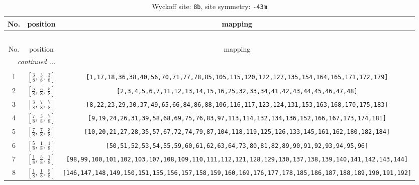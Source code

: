 \documentclass[fleqn,8pt]{jsarticle}
\begin{document}
\renewcommand{\arraystretch}{1.2}
\begin{longtable}{ccc}
\caption{Wyckoff site: {\tt 8b}, site symmetry: {\tt -43m}}
 \\
 \hline \hline
No. & position & mapping \\ \hline \endfirsthead

\multicolumn{2}{l}{\tablename\ \thetable{}} \\
 \hline \hline
No. & position & mapping \\ \hline \endhead

 \hline \hline
\multicolumn{2}{r}{\footnotesize\it continued ...} \\ \endfoot

 \hline \hline
\multicolumn{2}{r}{} \\ \endlastfoot

1 & $\left[ \frac{3}{8},\, \frac{3}{8},\, \frac{3}{8} \right]$ & {\tt [1,17,18,36,38,40,56,70,71,77,78,85,105,115,120,122,127,135,154,164,165,171,172,179]} \\ \hline
2 & $\left[ \frac{5}{8},\, \frac{5}{8},\, \frac{5}{8} \right]$ & {\tt [2,3,4,5,6,7,11,12,13,14,15,16,25,32,33,34,41,42,43,44,45,46,47,48]} \\ \hline
3 & $\left[ \frac{3}{8},\, \frac{7}{8},\, \frac{7}{8} \right]$ & {\tt [8,22,23,29,30,37,49,65,66,84,86,88,106,116,117,123,124,131,153,163,168,170,175,183]} \\ \hline
4 & $\left[ \frac{7}{8},\, \frac{3}{8},\, \frac{7}{8} \right]$ & {\tt [9,19,24,26,31,39,58,68,69,75,76,83,97,113,114,132,134,136,152,166,167,173,174,181]} \\ \hline
5 & $\left[ \frac{7}{8},\, \frac{7}{8},\, \frac{3}{8} \right]$ & {\tt [10,20,21,27,28,35,57,67,72,74,79,87,104,118,119,125,126,133,145,161,162,180,182,184]} \\ \hline
6 & $\left[ \frac{5}{8},\, \frac{1}{8},\, \frac{1}{8} \right]$ & {\tt [50,51,52,53,54,55,59,60,61,62,63,64,73,80,81,82,89,90,91,92,93,94,95,96]} \\ \hline
7 & $\left[ \frac{1}{8},\, \frac{5}{8},\, \frac{1}{8} \right]$ & {\tt [98,99,100,101,102,103,107,108,109,110,111,112,121,128,129,130,137,138,139,140,141,142,143,144]} \\ \hline
8 & $\left[ \frac{1}{8},\, \frac{1}{8},\, \frac{5}{8} \right]$ & {\tt [146,147,148,149,150,151,155,156,157,158,159,160,169,176,177,178,185,186,187,188,189,190,191,192]} \\
\end{longtable}
\renewcommand{\arraystretch}{1.2}
\end{document}
